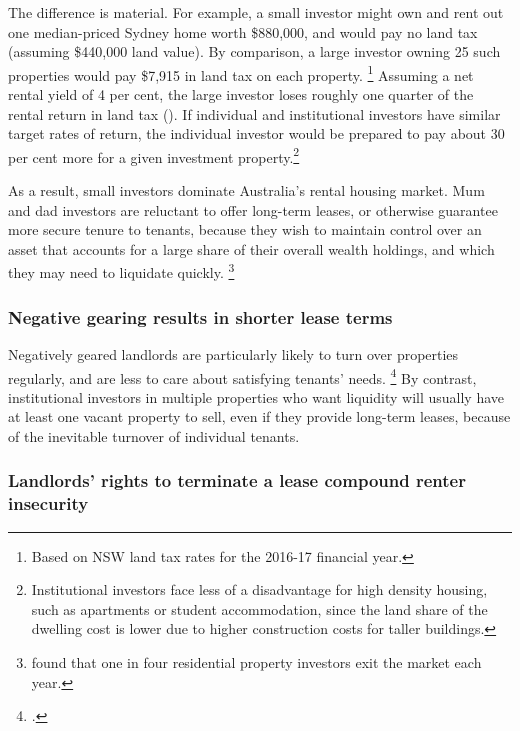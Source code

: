 The difference is material.
For example, a small investor might own and rent out one median-priced Sydney home worth \$880,000, and would pay no land tax (assuming \$440,000 land value).
By comparison, a large investor owning 25 such properties would pay \$7,915 in land tax on each property.%
	\footnote{Based on NSW land tax rates for the 2016-17 financial year.}
Assuming a net rental yield of 4 per cent, the large investor loses roughly one quarter of the rental return in land tax ().
If individual and institutional investors have similar target rates of return, the individual investor would be prepared to pay about 30 per cent more for a given investment property.\footnote{Institutional investors face less of a disadvantage for high density housing, such as apartments or student accommodation, since the land share of the dwelling cost is lower due to higher construction costs for taller buildings.}

As a result, small investors dominate Australia's rental housing market.
Mum and dad investors are reluctant to offer long-term leases, or otherwise guarantee more secure tenure to tenants, because they wish to maintain control over an asset that accounts for a large share of their overall wealth holdings, and which they may need to liquidate quickly.%
	\footnote{\textcite{Wood-Ong-AHURI-2010-factors-affecting-landlords} found that one in four residential property investors exit the market each year.}

\subsubsection{Negative gearing results in shorter lease terms }\label{subsec:negative-gearing-results-in-shorter-lease-terms}

Negatively geared landlords are particularly likely to turn over properties regularly, and are less to care about satisfying tenants' needs.%
	\footcite[][26]{DaleyWood2016-Negative-Gearing-CGT}
By contrast, institutional investors in multiple properties who want liquidity will usually have at least one vacant property to sell, even if they provide long-term leases, because of the inevitable turnover of individual tenants.

\subsubsection{Landlords' rights to terminate a lease compound renter insecurity }\label{subsec:landlords-right-to-terminate-a-lease-without-grounds-compounds-renter-insecurity}

